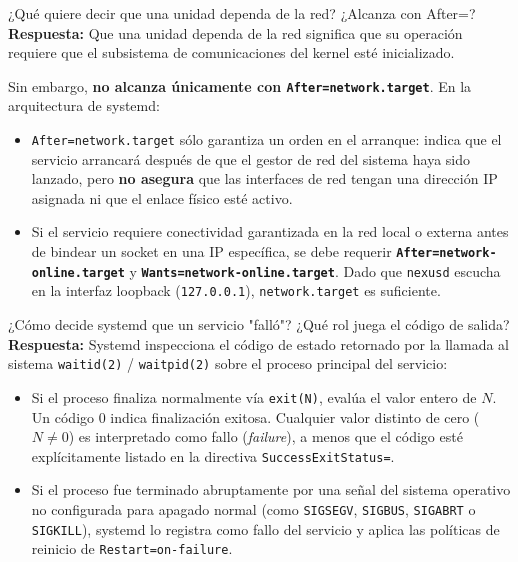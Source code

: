 \documentclass[10pt,a4paper]{article}
\begin{document}
\begin{pregunta}{¿Qué quiere decir que una unidad dependa de la red? ¿Alcanza con After=?}
    \textbf{Respuesta:} Que una unidad dependa de la red significa que su operación requiere que el subsistema de comunicaciones del kernel esté inicializado.
    
    Sin embargo, \textbf{no alcanza únicamente con \texttt{After=network.target}}. En la arquitectura de systemd:
    \begin{itemize}[leftmargin=*]
        \item \texttt{After=network.target} sólo garantiza un orden en el arranque: indica que el servicio arrancará después de que el gestor de red del sistema haya sido lanzado, pero \textbf{no asegura} que las interfaces de red tengan una dirección IP asignada ni que el enlace físico esté activo.
        \item Si el servicio requiere conectividad garantizada en la red local o externa antes de bindear un socket en una IP específica, se debe requerir \textbf{\texttt{After=network-online.target}} y \textbf{\texttt{Wants=network-online.target}}. Dado que \texttt{nexusd} escucha en la interfaz loopback (\texttt{127.0.0.1}), \texttt{network.target} es suficiente.
    \end{itemize}
\end{pregunta}

\begin{pregunta}{¿Cómo decide systemd que un servicio "falló"? ¿Qué rol juega el código de salida?}
    \textbf{Respuesta:} Systemd inspecciona el código de estado retornado por la llamada al sistema \texttt{waitid(2)} / \texttt{waitpid(2)} sobre el proceso principal del servicio:
    \begin{itemize}[leftmargin=*]
        \item Si el proceso finaliza normalmente vía \texttt{exit(N)}, evalúa el valor entero de $N$. Un código $0$ indica finalización exitosa. Cualquier valor distinto de cero ($N \neq 0$) es interpretado como fallo (\textit{failure}), a menos que el código esté explícitamente listado en la directiva \texttt{SuccessExitStatus=}.
        \item Si el proceso fue terminado abruptamente por una señal del sistema operativo no configurada para apagado normal (como \texttt{SIGSEGV}, \texttt{SIGBUS}, \texttt{SIGABRT} o \texttt{SIGKILL}), systemd lo registra como fallo del servicio y aplica las políticas de reinicio de \texttt{Restart=on-failure}.
    \end{itemize}
\end{pregunta}
\end{document}
